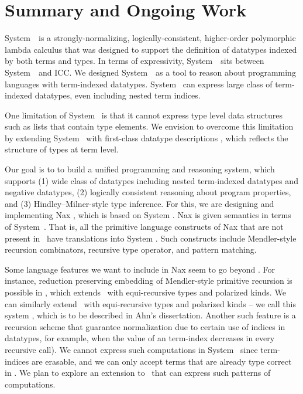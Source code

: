 \section{Summary and Ongoing Work} \label{sec:concl}
System~\Fi\ is a strongly-normalizing, logically-consistent, higher-order
polymorphic lambda calculus that was designed to support the
definition of datatypes indexed by both terms and types.
In terms of expressivity, System~\Fi\ sits between System~\Fw\ and ICC.
We designed System~\Fi\ as a tool to reason about programming
languages with term-indexed datatypes. System \Fi\ can express
large class of term-indexed datatypes, even including nested term
indices.

One limitation of System \Fi\ is that it cannot express type level
data structures such as lists that contain type elements.
We envision to overcome this limitation by extending System \Fi\ 
with first-class datatype descriptions \cite{DagMcb12}, which reflects
the structure of types at term level.

Our goal is to to build a unified programming and reasoning system,
which supports
(1) wide class of datatypes including nested term-indexed datatypes
and negative datatypes,
(2) logically consistent reasoning about program properties, and
(3) Hindley--Milner-style type inference.
For this, we are designing and implementing Nax \cite{AhnSheFioPit12},
which is based on System \Fi. Nax is given semantics in terms of System~\Fi.
That is, all the primitive language constructs of Nax that are not present
in \Fi\ have translations into System \Fi. Such constructs include
Mendler-style recursion combinators, recursive type operator, and
pattern matching.

Some language features we want to include in Nax seem to go beyond \Fi.
For instance, reduction preserving embedding of Mendler-style primitive
recursion is possible in \Fixw, which extends \Fw\ with equi-recursive
types and polarized kinds. We can similarly extend \Fi\ with equi-recursive
types and polarized kinds -- we call this system \Fixi, which is to be
described in Ahn's dissertation. Another such feature is a recursion
scheme that guarantee normalization due to certain use of indices in datatypes,
for example, when the value of an term-index decreases in every recursive call).
We cannot express such computations in System \Fi\ since term-indices are
erasable, and we can only accept terms that are already type correct in \Fw.
We plan to explore an extension to \Fi\ that can express such patterns of
computations.

